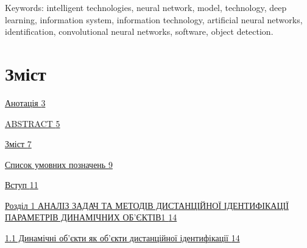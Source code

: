 \documentclass[
]{article}
\begin{document}
Keywords: intelligent technologies, neural network, model, technology, deep learning, information system, information technology, artificial neural networks, identification, convolutional neural networks, software, object detection.

\section{Зміст}\label{ux437ux43cux456ux441ux442}

\hyperref[_Toc227583609]{Анотація \hyperref[_Toc227583609]{3}}

\hyperref[abstract]{ABSTRACT \hyperref[abstract]{5}}

\hyperref[ux437ux43cux456ux441ux442]{Зміст \hyperref[ux437ux43cux456ux441ux442]{7}}

\hyperref[ux441ux43fux438ux441ux43eux43a-ux443ux43cux43eux432ux43dux438ux445-ux43fux43eux437ux43dux430ux447ux435ux43dux44c]{Список умовних позначень \hyperref[ux441ux43fux438ux441ux43eux43a-ux443ux43cux43eux432ux43dux438ux445-ux43fux43eux437ux43dux430ux447ux435ux43dux44c]{9}}

\hyperref[ux432ux441ux442ux443ux43f]{Вступ \hyperref[ux432ux441ux442ux443ux43f]{11}}

\hyperref[ux440ux43eux437ux434ux456ux43b-1-ux430ux43dux430ux43bux456ux437-ux437ux430ux434ux430ux447-ux442ux430-ux43cux435ux442ux43eux434ux456ux432-ux434ux438ux441ux442ux430ux43dux446ux456ux439ux43dux43eux457-ux456ux434ux435ux43dux442ux438ux444ux456ux43aux430ux446ux456ux457-ux43fux430ux440ux430ux43cux435ux442ux440ux456ux432-ux434ux438ux43dux430ux43cux456ux447ux43dux438ux445-ux43eux431ux454ux43aux442ux456ux432]{Розділ 1 АНАЛІЗ ЗАДАЧ ТА МЕТОДІВ ДИСТАНЦІЙНОЇ ІДЕНТИФІКАЦІЇ ПАРАМЕТРІВ ДИНАМІЧНИХ ОБ'ЄКТІВ1 \hyperref[ux440ux43eux437ux434ux456ux43b-1-ux430ux43dux430ux43bux456ux437-ux437ux430ux434ux430ux447-ux442ux430-ux43cux435ux442ux43eux434ux456ux432-ux434ux438ux441ux442ux430ux43dux446ux456ux439ux43dux43eux457-ux456ux434ux435ux43dux442ux438ux444ux456ux43aux430ux446ux456ux457-ux43fux430ux440ux430ux43cux435ux442ux440ux456ux432-ux434ux438ux43dux430ux43cux456ux447ux43dux438ux445-ux43eux431ux454ux43aux442ux456ux432]{14}}

\hyperref[ux434ux438ux43dux430ux43cux456ux447ux43dux456-ux43eux431ux454ux43aux442ux438-ux44fux43a-ux43eux431ux454ux43aux442ux438-ux434ux438ux441ux442ux430ux43dux446ux456ux439ux43dux43eux457-ux456ux434ux435ux43dux442ux438ux444ux456ux43aux430ux446ux456ux457]{1.1 Динамічні об'єкти як об'єкти дистанційної ідентифікації \hyperref[ux434ux438ux43dux430ux43cux456ux447ux43dux456-ux43eux431ux454ux43aux442ux438-ux44fux43a-ux43eux431ux454ux43aux442ux438-ux434ux438ux441ux442ux430ux43dux446ux456ux439ux43dux43eux457-ux456ux434ux435ux43dux442ux438ux444ux456ux43aux430ux446ux456ux457]{14}}
\end{document}
